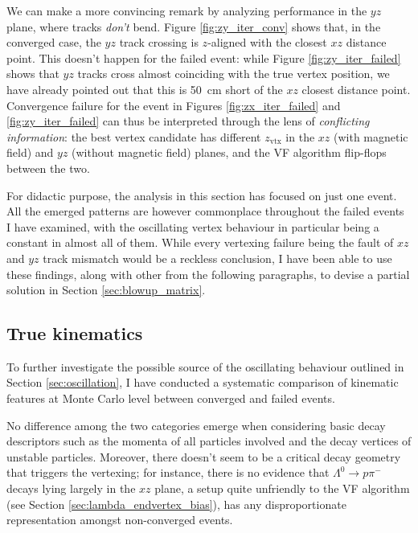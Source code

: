 We can make a more convincing remark by analyzing performance in the $yz$ plane, where tracks \textit{don't} bend.
Figure \ref{fig:zy_iter_conv} shows that, in the converged case, the $yz$ track crossing is $z$-aligned with the closest $xz$ distance point.
This doesn't happen for the failed event: while Figure \ref{fig:zy_iter_failed} shows that $yz$ tracks cross almost coinciding with the true vertex position, we have already pointed out that this is \SI{50}{cm} short of the $xz$ closest distance point.
Convergence failure for the event in Figures \ref{fig:zx_iter_failed} and \ref{fig:zy_iter_failed} can thus be interpreted through the lens of \textit{conflicting information}:
the best vertex candidate has different $z_\text{vtx}$ in the $xz$ (with magnetic field) and $yz$ (without magnetic field) planes, and the VF algorithm flip-flops between the two.

For didactic purpose, the analysis in this section has focused on just one event.
All the emerged patterns are however commonplace throughout the failed events I have examined, with the oscillating vertex behaviour in particular being a constant in almost all of them.
While every \lbz vertexing failure being the fault of $xz$ and $yz$ track mismatch would be a reckless conclusion, I have been able to use these findings, along with other from the following paragraphs, to devise a partial solution in Section \ref{sec:blowup_matrix}.

\subsection{True kinematics}
To further investigate the possible source of the oscillating behaviour outlined in Section \ref{sec:oscillation}, I have conducted a systematic comparison of kinematic features at Monte Carlo level between converged and failed events.

No difference among the two categories emerge when considering basic decay descriptors such as the momenta of all particles involved and the decay vertices of unstable particles.
Moreover, there doesn't seem to be a critical decay geometry that triggers the vertexing;
for instance, there is no evidence that $\Lambda^0 \rightarrow p\pi^-$ decays lying largely in the $xz$ plane, a setup quite unfriendly to the VF algorithm (see Section \ref{sec:lambda_endvertex_bias}), has any disproportionate representation amongst non-converged events.

